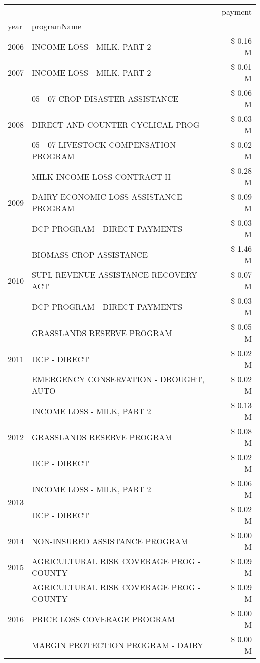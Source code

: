 \begin{tabular}{llr}
\toprule
 &  & payment \\
year & programName &  \\
\midrule
2006 & INCOME LOSS - MILK, PART 2 & \$ 0.16 M \\
\cline{1-3}
2007 & INCOME LOSS - MILK, PART 2 & \$ 0.01 M \\
\cline{1-3}
\multirow[t]{3}{*}{2008} & 05 - 07 CROP DISASTER ASSISTANCE & \$ 0.06 M \\
 & DIRECT AND COUNTER CYCLICAL PROG & \$ 0.03 M \\
 & 05 - 07 LIVESTOCK COMPENSATION PROGRAM & \$ 0.02 M \\
\cline{1-3}
\multirow[t]{3}{*}{2009} & MILK INCOME LOSS CONTRACT II & \$ 0.28 M \\
 & DAIRY ECONOMIC LOSS ASSISTANCE PROGRAM & \$ 0.09 M \\
 & DCP PROGRAM - DIRECT PAYMENTS & \$ 0.03 M \\
\cline{1-3}
\multirow[t]{3}{*}{2010} & BIOMASS CROP ASSISTANCE & \$ 1.46 M \\
 & SUPL REVENUE ASSISTANCE RECOVERY ACT & \$ 0.07 M \\
 & DCP PROGRAM - DIRECT PAYMENTS & \$ 0.03 M \\
\cline{1-3}
\multirow[t]{3}{*}{2011} & GRASSLANDS RESERVE PROGRAM & \$ 0.05 M \\
 & DCP - DIRECT & \$ 0.02 M \\
 & EMERGENCY CONSERVATION - DROUGHT, AUTO & \$ 0.02 M \\
\cline{1-3}
\multirow[t]{3}{*}{2012} & INCOME LOSS - MILK, PART 2 & \$ 0.13 M \\
 & GRASSLANDS RESERVE PROGRAM & \$ 0.08 M \\
 & DCP - DIRECT & \$ 0.02 M \\
\cline{1-3}
\multirow[t]{2}{*}{2013} & INCOME LOSS - MILK, PART 2 & \$ 0.06 M \\
 & DCP - DIRECT & \$ 0.02 M \\
\cline{1-3}
2014 & NON-INSURED ASSISTANCE PROGRAM & \$ 0.00 M \\
\cline{1-3}
2015 & AGRICULTURAL RISK COVERAGE PROG - COUNTY & \$ 0.09 M \\
\cline{1-3}
\multirow[t]{3}{*}{2016} & AGRICULTURAL RISK COVERAGE PROG - COUNTY & \$ 0.09 M \\
 & PRICE LOSS COVERAGE PROGRAM & \$ 0.00 M \\
 & MARGIN PROTECTION PROGRAM - DAIRY & \$ 0.00 M \\

\end{tabular}
